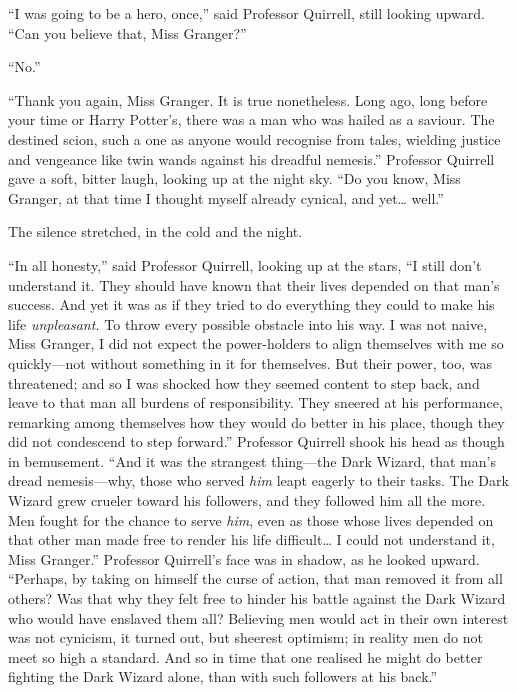 ``I was going to be a hero, once,'' said Professor Quirrell, still
looking upward. ``Can you believe that, Miss Granger?''

``No.''

``Thank you again, Miss Granger. It is true nonetheless. Long ago, long
before your time or Harry Potter's, there was a man who was hailed as a
saviour. The destined scion, such a one as anyone would recognise from
tales, wielding justice and vengeance like twin wands against his
dreadful nemesis.'' Professor Quirrell gave a soft, bitter laugh,
looking up at the night sky. ``Do you know, Miss Granger, at that time I
thought myself already cynical, and yet\ldots{} well.''

The silence stretched, in the cold and the night.

``In all honesty,'' said Professor Quirrell, looking up at the stars,
``I still don't understand it. They should have known that their lives
depended on that man's success. And yet it was as if they tried to do
everything they could to make his life \emph{unpleasant.} To throw every
possible obstacle into his way. I was not naive, Miss Granger, I did not
expect the power-holders to align themselves with me so quickly---not
without something in it for themselves. But their power, too, was
threatened; and so I was shocked how they seemed content to step back,
and leave to that man all burdens of responsibility. They sneered at his
performance, remarking among themselves how they would do better in his
place, though they did not condescend to step forward.'' Professor
Quirrell shook his head as though in bemusement. ``And it was the
strangest thing---the Dark Wizard, that man's dread nemesis---why, those
who served \emph{him} leapt eagerly to their tasks. The Dark Wizard grew
crueler toward his followers, and they followed him all the more. Men
fought for the chance to serve \emph{him}, even as those whose lives
depended on that other man made free to render his life
difficult\ldots{} I could not understand it, Miss Granger.'' Professor
Quirrell's face was in shadow, as he looked upward. ``Perhaps, by taking
on himself the curse of action, that man removed it from all others? Was
that why they felt free to hinder his battle against the Dark Wizard who
would have enslaved them all? Believing men would act in their own
interest was not cynicism, it turned out, but sheerest optimism; in
reality men do not meet so high a standard. And so in time that one
realised he might do better fighting the Dark Wizard alone, than with
such followers at his back.''

